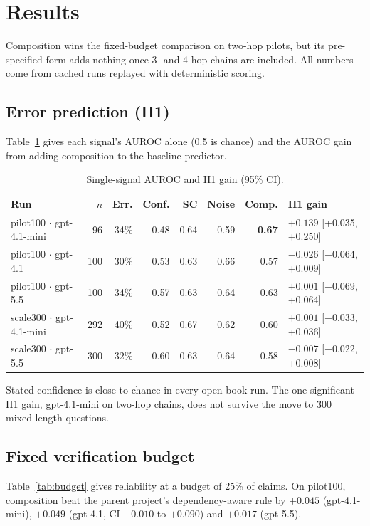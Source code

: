 \documentclass[11pt]{article}
\begin{document}
\section{Results}

Composition wins the fixed-budget comparison on two-hop pilots, but its pre-specified form
adds nothing once 3- and 4-hop chains are included. All numbers come from cached runs
replayed with deterministic scoring.

\subsection{Error prediction (H1)}
Table~\ref{tab:h1} gives each signal's AUROC alone (0.5 is chance) and the AUROC gain from
adding composition to the baseline predictor.

\begin{table}[h]
\centering
\small
\caption{Single-signal AUROC and H1 gain (95\% CI).}
\label{tab:h1}
\begin{tabular}{lrrrrrrl}
\toprule
Run & $n$ & Err. & Conf. & SC & Noise & Comp. & H1 gain \\
\midrule
pilot100 $\cdot$ gpt-4.1-mini & 96 & 34\% & 0.48 & 0.64 & 0.59 & \textbf{0.67} & $\mathbf{+0.139}$ [+0.035, +0.250] \\
pilot100 $\cdot$ gpt-4.1 & 100 & 30\% & 0.53 & 0.63 & 0.66 & 0.57 & $-0.026$ [$-0.064$, +0.009] \\
pilot100 $\cdot$ gpt-5.5 & 100 & 34\% & 0.57 & 0.63 & 0.64 & 0.63 & $+0.001$ [$-0.069$, +0.064] \\
scale300 $\cdot$ gpt-4.1-mini & 292 & 40\% & 0.52 & 0.67 & 0.62 & 0.60 & $+0.001$ [$-0.033$, +0.036] \\
scale300 $\cdot$ gpt-5.5 & 300 & 32\% & 0.60 & 0.63 & 0.64 & 0.58 & $-0.007$ [$-0.022$, +0.008] \\
\bottomrule
\end{tabular}
\end{table}

Stated confidence is close to chance in every open-book run. The one significant H1 gain,
gpt-4.1-mini on two-hop chains, does not survive the move to 300 mixed-length questions.

\subsection{Fixed verification budget}
Table~\ref{tab:budget} gives reliability at a budget of 25\% of claims. On pilot100,
composition beat the parent project's dependency-aware rule by $+0.045$ (gpt-4.1-mini),
$+0.049$ (gpt-4.1, CI $+0.010$ to $+0.090$) and $+0.017$ (gpt-5.5).
\end{document}
